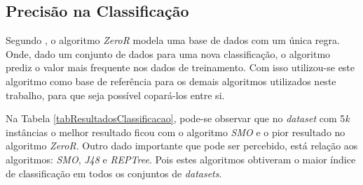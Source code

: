 \documentclass[
	12pt,				%
	openright,			%
	oneside,	
	a4paper,				%
	english,				%
	brazil				%
]{abntex2/abntex2} %
\begin{document}
	\subsection{Precisão na Classificação}
	
	Segundo \cite{witten:2011}, o algoritmo \textit{ZeroR} modela uma base de dados com um única regra. Onde, dado um conjunto de dados para uma nova classificação, o algoritmo prediz o valor mais frequente nos dados de treinamento. Com isso utilizou-se este algoritmo como base de referência para os demais algoritmos utilizados neste trabalho, para que seja possível copará-los entre si.
	
	Na Tabela \ref{tabResultadosClassificacao}, pode-se observar que no \textit{dataset} com 5\textit{k} instâncias o melhor resultado ficou com o algoritmo \textit{SMO} e o pior resultado no algoritmo \textit{ZeroR}. Outro dado importante que pode ser percebido, está relação aos algoritmos: \textit{SMO}, \textit{J48} e \textit{REPTree}. Pois estes algoritmos obtiveram o maior índice de classificação em todos os conjuntos de \textit{datasets}.
	\\
	
\end{document}
